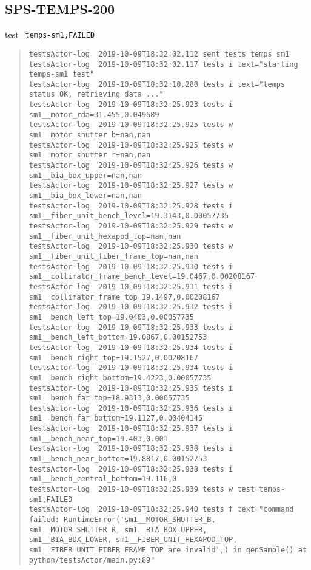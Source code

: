 \subsection{SPS-TEMPS-200}
\label{sec:tc-200}

test=\texttt{temps-sm1,FAILED}

\begin{quote}
\begin{tiny}
\begin{verbatim}
testsActor-log  2019-10-09T18:32:02.112 sent tests temps sm1
testsActor-log  2019-10-09T18:32:02.117 tests i text="starting temps-sm1 test"
testsActor-log  2019-10-09T18:32:10.288 tests i text="temps status OK, retrieving data ..."
testsActor-log  2019-10-09T18:32:25.923 tests i sm1__motor_rda=31.455,0.049689
testsActor-log  2019-10-09T18:32:25.925 tests w sm1__motor_shutter_b=nan,nan
testsActor-log  2019-10-09T18:32:25.925 tests w sm1__motor_shutter_r=nan,nan
testsActor-log  2019-10-09T18:32:25.926 tests w sm1__bia_box_upper=nan,nan
testsActor-log  2019-10-09T18:32:25.927 tests w sm1__bia_box_lower=nan,nan
testsActor-log  2019-10-09T18:32:25.928 tests i sm1__fiber_unit_bench_level=19.3143,0.00057735
testsActor-log  2019-10-09T18:32:25.929 tests w sm1__fiber_unit_hexapod_top=nan,nan
testsActor-log  2019-10-09T18:32:25.930 tests w sm1__fiber_unit_fiber_frame_top=nan,nan
testsActor-log  2019-10-09T18:32:25.930 tests i sm1__collimator_frame_bench_level=19.0467,0.00208167
testsActor-log  2019-10-09T18:32:25.931 tests i sm1__collimator_frame_top=19.1497,0.00208167
testsActor-log  2019-10-09T18:32:25.932 tests i sm1__bench_left_top=19.0403,0.00057735
testsActor-log  2019-10-09T18:32:25.933 tests i sm1__bench_left_bottom=19.0867,0.00152753
testsActor-log  2019-10-09T18:32:25.934 tests i sm1__bench_right_top=19.1527,0.00208167
testsActor-log  2019-10-09T18:32:25.934 tests i sm1__bench_right_bottom=19.4223,0.00057735
testsActor-log  2019-10-09T18:32:25.935 tests i sm1__bench_far_top=18.9313,0.00057735
testsActor-log  2019-10-09T18:32:25.936 tests i sm1__bench_far_bottom=19.1127,0.00404145
testsActor-log  2019-10-09T18:32:25.937 tests i sm1__bench_near_top=19.403,0.001
testsActor-log  2019-10-09T18:32:25.938 tests i sm1__bench_near_bottom=19.8817,0.00152753
testsActor-log  2019-10-09T18:32:25.938 tests i sm1__bench_central_bottom=19.116,0
testsActor-log  2019-10-09T18:32:25.939 tests w test=temps-sm1,FAILED
testsActor-log  2019-10-09T18:32:25.940 tests f text="command failed: RuntimeError('sm1__MOTOR_SHUTTER_B, sm1__MOTOR_SHUTTER_R, sm1__BIA_BOX_UPPER,
sm1__BIA_BOX_LOWER, sm1__FIBER_UNIT_HEXAPOD_TOP, sm1__FIBER_UNIT_FIBER_FRAME_TOP are invalid',) in genSample() at python/testsActor/main.py:89"
\end{verbatim}
\end{tiny}
\end{quote}

